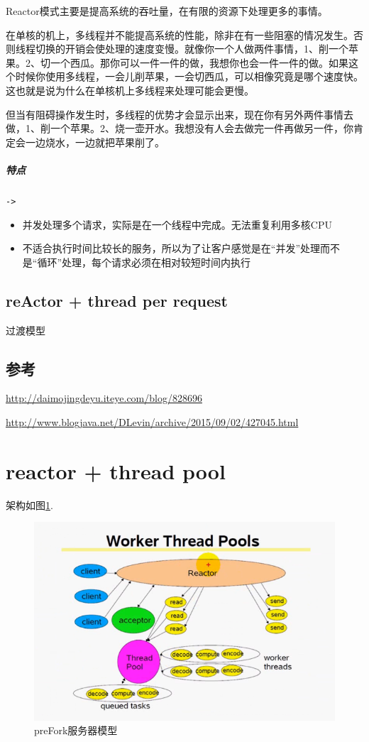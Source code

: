 \documentclass[UTF8,a4paper,12pt]{ctexbook}
\begin{document}
			Reactor模式主要是提高系统的吞吐量，在有限的资源下处理更多的事情。
			
			在单核的机上，多线程并不能提高系统的性能，除非在有一些阻塞的情况发生。否则线程切换的开销会使处理的速度变慢。就像你一个人做两件事情，1、削一个苹果。2、切一个西瓜。那你可以一件一件的做，我想你也会一件一件的做。如果这个时候你使用多线程，一会儿削苹果，一会切西瓜，可以相像究竟是哪个速度快。这也就是说为什么在单核机上多线程来处理可能会更慢。
			
			但当有阻碍操作发生时，多线程的优势才会显示出来，现在你有另外两件事情去做，1、削一个苹果。2、烧一壶开水。我想没有人会去做完一件再做另一件，你肯定会一边烧水，一边就把苹果削了。
			
			\subparagraph{特点}\verb|->|
				\begin{itemize}[itemindent = 1em]
					\item 并发处理多个请求，实际是在一个线程中完成。无法重复利用多核CPU
					\item 不适合执行时间比较长的服务，所以为了让客户感觉是在“并发”处理而不是“循环”处理，每个请求必须在相对较短时间内执行
				\end{itemize}
				
		\subsection{reActor + thread per request}过渡模型
		\subsection{参考}
			\url{http://daimojingdeyu.iteye.com/blog/828696}
	
			\url{http://www.blogjava.net/DLevin/archive/2015/09/02/427045.html}	
			
	\newpage
	\section{reactor + thread pool}
		架构如图\ref{reactorThreadpool}.
		
		\begin{figure}[htbp]
			\centering
			\includegraphics[scale = 0.8]{figures/reactorThreadpool.png}
			\caption{preFork服务器模型}
			\label{reactorThreadpool}
		\end{figure}
		
\end{document}
